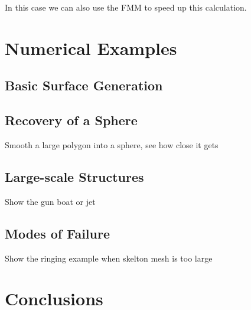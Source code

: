 \documentclass[11pt]{article}
\numberwithin{equation}{section}
\DeclareMathOperator\erf{Erf}
\begin{document}
In this case we can also use the FMM to speed up this calculation.





\section{Numerical Examples}
\label{sec:examples}

\subsection{Basic Surface Generation}
\label{sec:basic}


\subsection{Recovery of a Sphere}
\label{sec:sphere}

Smooth a large polygon into a sphere, see how close it gets


\subsection{Large-scale Structures}
\label{sec:large}

Show the gun boat or jet



\subsection{Modes of Failure}
\label{sec:failure}

Show the ringing example when skelton mesh is too large




\section{Conclusions}
\label{sec:conclusions}






























  
\end{document}
